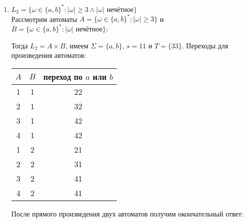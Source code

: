 \documentclass{article}
\begin{document}
\begin{enumerate}
        \item \(L_2=\{\omega \in\{a,b\}^* : |\omega| \geqslant 3 \wedge |\omega| \text{ нечётное} \} \) \\
        Рассмотрим автоматы \(A=\{\omega \in\{a,b\}^* : |\omega| \geqslant 3\} \) и \(B=\{\omega \in\{a,b\}^* : |\omega| \text{ нечётное} \} \):
        \begin{center}
        \end{center}
        Тогда \(L_2=A \times B\), имеем \(\Sigma=\{a,b\}\), \(s=11\) и \(T=\{33\}\). Переходы для произведения автоматов:
        \begin{center}
            \begin{tabular}{ |c|c|c| } 
                \hline
                \(A\) & \(B\) & переход по \(a\) или \(b\) \\
                \hline\hline
                1 & 1 & 22 \\
                \hline
                2 & 1 & 32 \\
                \hline
                3 & 1 & 42 \\
                \hline
                4 & 1 & 42 \\
                \hline
                1 & 2 & 21 \\
                \hline
                2 & 2 & 31 \\
                \hline
                3 & 2 & 41 \\
                \hline
                4 & 2 & 41 \\
                \hline
            \end{tabular}
        \end{center}
        После прямого произведения двух автоматов получим окончательный ответ:
        \begin{center}

\end{center}
\end{enumerate}
\end{document}
